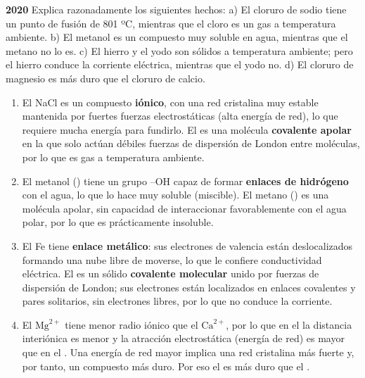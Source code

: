 \begin{exerciseEVAU}
    \textbf{2020} Explica razonadamente los siguientes hechos: a) El cloruro de sodio tiene un punto de fusión de 801 ºC,
    mientras que el cloro es un gas a temperatura ambiente. b) El metanol es un compuesto muy soluble en agua, mientras que el metano no lo es.
    c) El hierro y el yodo son sólidos a temperatura ambiente; pero el hierro conduce la corriente eléctrica, mientras que el yodo no. d) El cloruro de magnesio es más duro que el cloruro de calcio.

    \begin{solu}


        \begin{enumerate}[label=\letraminuscula]
            \item El NaCl es un compuesto \textbf{iónico}, con una red cristalina muy estable mantenida por fuertes fuerzas electrostáticas (alta energía de red), lo que requiere mucha energía para fundirlo. El  es una molécula \textbf{covalente apolar} en la que solo actúan débiles fuerzas de dispersión de London entre moléculas, por lo que es gas a temperatura ambiente.

            \item El metanol () tiene un grupo --OH capaz de formar \textbf{enlaces de hidrógeno} con el agua, lo que lo hace muy soluble (miscible). El metano () es una molécula apolar, sin capacidad de interaccionar favorablemente con el agua polar, por lo que es prácticamente insoluble.

            \item El Fe tiene \textbf{enlace metálico}: sus electrones de valencia están deslocalizados formando una nube libre de moverse, lo que le confiere conductividad eléctrica. El  es un sólido \textbf{covalente molecular} unido por fuerzas de dispersión de London; sus electrones están localizados en enlaces covalentes y pares solitarios, sin electrones libres, por lo que no conduce la corriente.

            \item El \(\text{Mg}^{2+}\) tiene menor radio iónico que el \(\text{Ca}^{2+}\), por lo que en el  la distancia interiónica es menor y la atracción electrostática (energía de red) es mayor que en el . Una energía de red mayor implica una red cristalina más fuerte y, por tanto, un compuesto más duro. Por eso el  es más duro que el .
        \end{enumerate}
    \end{solu}
\end{exerciseEVAU}
